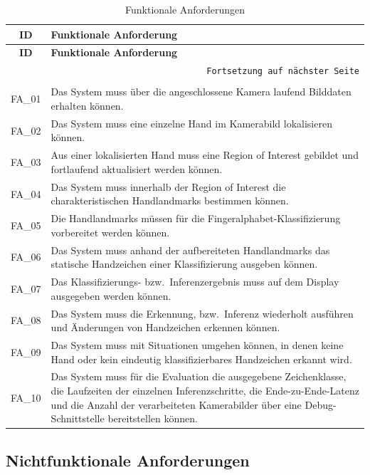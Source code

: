 \begin{longtable}{|c|p{}|}
    \hline
    \textbf{ID} & \textbf{Funktionale Anforderung} \\
    \hline
    \endfirsthead
    \hline
    \textbf{ID} & \textbf{Funktionale Anforderung} \\
    \hline
    \endhead
    \hline
    \multicolumn{2}{r}{\texttt{Fortsetzung auf nächster Seite}} \\
    \endfoot
    \caption{Funktionale Anforderungen}
    \label{tab:funktionale-anforderungen} \\
    \endlastfoot
    FA\_01 & Das System muss über die angeschlossene Kamera laufend Bilddaten erhalten können. \\
    \hline
    FA\_02 & Das System muss eine einzelne Hand im Kamerabild lokalisieren können. \\
    \hline
    FA\_03 & Aus einer lokalisierten Hand muss eine Region of Interest gebildet und fortlaufend aktualisiert werden können. \\
    \hline
    FA\_04 & Das System muss innerhalb der Region of Interest die charakteristischen Handlandmarks bestimmen können. \\
    \hline
    FA\_05 & Die Handlandmarks müssen für die Fingeralphabet-Klassifizierung vorbereitet werden können. \\
    \hline
    FA\_06 & Das System muss anhand der aufbereiteten Handlandmarks das statische Handzeichen einer Klassifizierung ausgeben können. \\
    \hline
    FA\_07 & Das Klassifizierungs- bzw.\ Inferenzergebnis muss auf dem Display ausgegeben werden können. \\
    \hline
    FA\_08 & Das System muss die Erkennung, bzw.\ Inferenz wiederholt ausführen und Änderungen von Handzeichen erkennen können. \\
    \hline
    FA\_09 & Das System muss mit Situationen umgehen können, in denen keine Hand oder kein eindeutig klassifizierbares Handzeichen erkannt wird. \\
    \hline
    FA\_10 & Das System muss für die Evaluation die ausgegebene Zeichenklasse, die Laufzeiten der einzelnen Inferenzschritte, die Ende-zu-Ende-Latenz und die Anzahl der verarbeiteten Kamerabilder über eine Debug-Schnittstelle bereitstellen können. \\
    \hline
\end{longtable}

\subsection{Nichtfunktionale Anforderungen}\label{sub:nonfunc-anforderungen}

